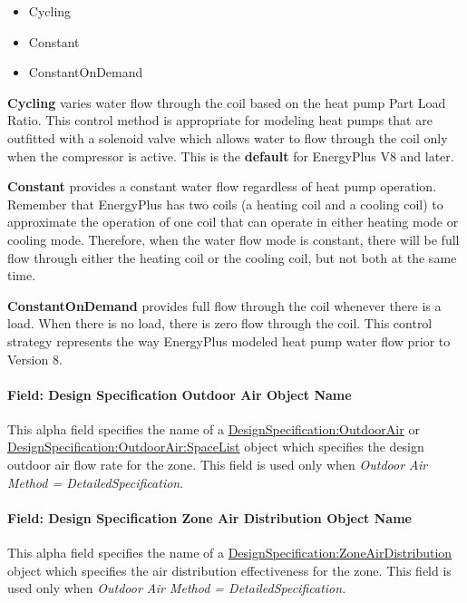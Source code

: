 \begin{itemize}
\item
  Cycling
\item
  Constant
\item
  ConstantOnDemand
\end{itemize}

\textbf{Cycling} varies water flow through the coil based on the heat pump Part Load Ratio. This control method is appropriate for modeling heat pumps that are outfitted with a solenoid valve which allows water to flow through the coil only when the compressor is active. This is the \textbf{default} for EnergyPlus V8 and later.

\textbf{Constant} provides a constant water flow regardless of heat pump operation. Remember that EnergyPlus has two coils (a heating coil and a cooling coil) to approximate the operation of one coil that can operate in either heating mode or cooling mode. Therefore, when the water flow mode is constant, there will be full flow through either the heating coil or the cooling coil, but not both at the same time.

\textbf{ConstantOnDemand} provides full flow through the coil whenever there is a load. When there is no load, there is zero flow through the coil. This control strategy represents the way EnergyPlus modeled heat pump water flow prior to Version 8.

\paragraph{Field: Design Specification Outdoor Air Object Name}\label{field-design-specification-outdoor-air-object-name-5}

This alpha field specifies the name of a \hyperref[designspecificationoutdoorair]{DesignSpecification:OutdoorAir} or \hyperref[designspecificationoutdoorairspacelist]{DesignSpecification:OutdoorAir:SpaceList} object which specifies the design outdoor air flow rate for the zone. This field is used only when \emph{Outdoor Air Method = DetailedSpecification}.

\paragraph{Field: Design Specification Zone Air Distribution Object Name}\label{field-design-specification-zone-air-distribution-object-name-4}

This alpha field specifies the name of a \hyperref[designspecificationzoneairdistribution]{DesignSpecification:ZoneAirDistribution} object which specifies the air distribution effectiveness for the zone. This field is used only when \emph{Outdoor Air Method = DetailedSpecification}.

